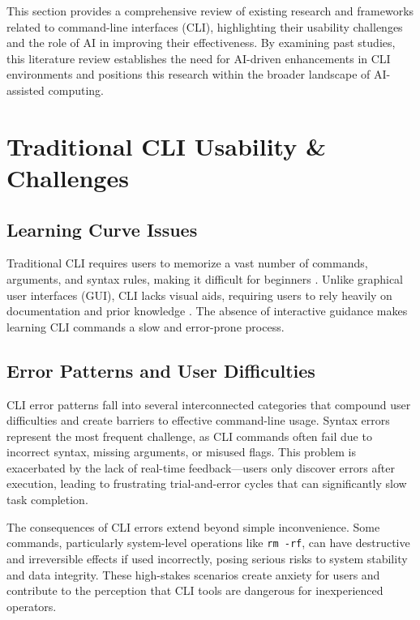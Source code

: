 This section provides a comprehensive review of existing research and frameworks related to command-line interfaces (CLI), highlighting their usability challenges and the role of AI in improving their effectiveness. By examining past studies, this literature review establishes the need for AI-driven enhancements in CLI environments and positions this research within the broader landscape of AI-assisted computing.

\section{Traditional CLI Usability \& Challenges}

\subsection{Learning Curve Issues}

Traditional CLI requires users to memorize a vast number of commands, arguments, and syntax rules, making it difficult for beginners \cite{margono1987}. Unlike graphical user interfaces (GUI), CLI lacks visual aids, requiring users to rely heavily on documentation and prior knowledge \cite{card1983}. The absence of interactive guidance makes learning CLI commands a slow and error-prone process.

\subsection{Error Patterns and User Difficulties}

CLI error patterns fall into several interconnected categories that compound user difficulties and create barriers to effective command-line usage. Syntax errors represent the most frequent challenge, as CLI commands often fail due to incorrect syntax, missing arguments, or misused flags. This problem is exacerbated by the lack of real-time feedback—users only discover errors after execution, leading to frustrating trial-and-error cycles that can significantly slow task completion.

The consequences of CLI errors extend beyond simple inconvenience. Some commands, particularly system-level operations like \texttt{rm -rf}, can have destructive and irreversible effects if used incorrectly, posing serious risks to system stability and data integrity. These high-stakes scenarios create anxiety for users and contribute to the perception that CLI tools are dangerous for inexperienced operators.

